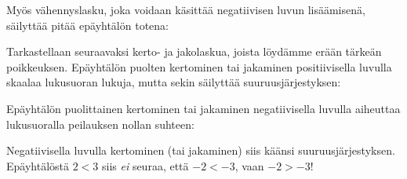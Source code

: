 Myös vähennyslasku, joka voidaan käsittää negatiivisen luvun lisäämisenä, säilyttää pitää epäyhtälön totena:

\begin{lukusuora}{-1}{10}{12}

\lukusuorauusi
\end{lukusuora}

Tarkastellaan seuraavaksi kerto- ja jakolaskua, joista löydämme erään tärkeän poikkeuksen. Epäyhtälön puolten kertominen tai jakaminen positiivisella luvulla skaalaa lukusuoran lukuja, mutta sekin säilyttää suuruusjärjestyksen:

\begin{lukusuora}{-1}{10}{12}

\lukusuorauusi
\end{lukusuora}

\begin{lukusuora}{-1}{10}{12}

\lukusuorauusi
\end{lukusuora}

Epäyhtälön puolittainen kertominen tai jakaminen negatiivisella luvulla aiheuttaa lukusuoralla peilauksen nollan suhteen:

\begin{lukusuora}{-6}{10}{6}

\lukusuorauusi
\end{lukusuora}

Negatiivisella luvulla kertominen (tai jakaminen) siis käänsi suuruusjärjestyksen.
Epäyhtälöstä $2<3$ siis \textit{ei} seuraa, että $-2<-3$, vaan $-2>-3$!

